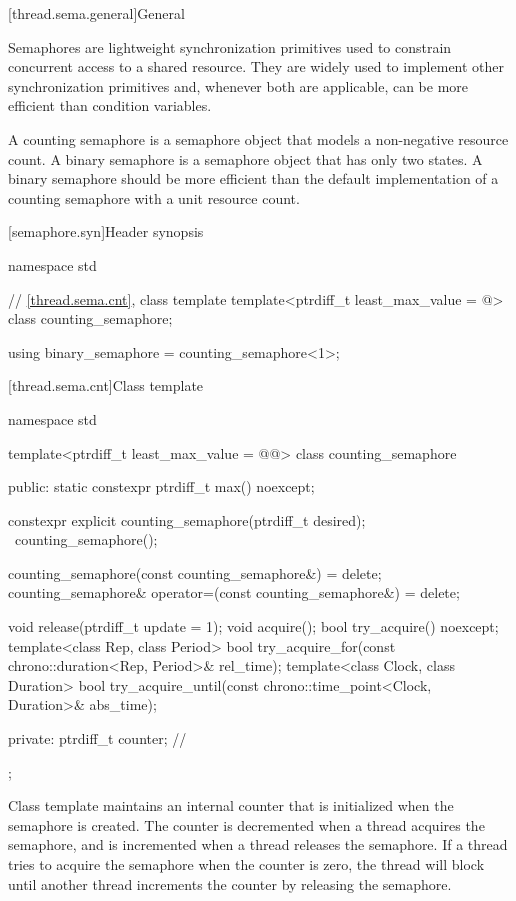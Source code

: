 [thread.sema.general]{General}

\pnum
Semaphores are lightweight synchronization primitives
used to constrain concurrent access to a shared resource.
They are widely used to implement other synchronization primitives and,
whenever both are applicable, can be more efficient than condition variables.

\pnum
A counting semaphore is a semaphore object
that models a non-negative resource count.
A binary semaphore is a semaphore object that has only two states.
A binary semaphore should be more efficient than
the default implementation of a counting semaphore with a unit resource count.

[semaphore.syn]{Header  synopsis}

%
\begin{codeblock}
namespace std {
  // \ref{thread.sema.cnt}, class template 
  template<ptrdiff_t least_max_value = @\impdef@>
    class counting_semaphore;

  using binary_semaphore = counting_semaphore<1>;
}
\end{codeblock}

[thread.sema.cnt]{Class template }

\begin{codeblock}
namespace std {
  template<ptrdiff_t least_max_value = @@>
  class counting_semaphore {
  public:
    static constexpr ptrdiff_t max() noexcept;

    constexpr explicit counting_semaphore(ptrdiff_t desired);
    ~counting_semaphore();

    counting_semaphore(const counting_semaphore&) = delete;
    counting_semaphore& operator=(const counting_semaphore&) = delete;

    void release(ptrdiff_t update = 1);
    void acquire();
    bool try_acquire() noexcept;
    template<class Rep, class Period>
      bool try_acquire_for(const chrono::duration<Rep, Period>& rel_time);
    template<class Clock, class Duration>
      bool try_acquire_until(const chrono::time_point<Clock, Duration>& abs_time);

  private:
    ptrdiff_t counter;          // \expos
  };
}
\end{codeblock}

\pnum
{}%
Class template  maintains an internal counter
that is initialized when the semaphore is created.
The counter is decremented when a thread acquires the semaphore, and
is incremented when a thread releases the semaphore.
If a thread tries to acquire the semaphore when the counter is zero,
the thread will block
until another thread increments the counter by releasing the semaphore.

